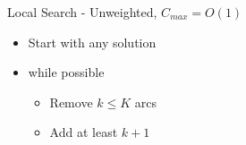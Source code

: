 \begin{frame}{Local Search - Unweighted, $C_{max} = O(1)$}
\begin{itemize}
  \item Start with any solution
  \item while possible
  	\begin{itemize}
  	  \item Remove $k \leq K$ arcs
  	  \item Add at least $k+1$
	\end{itemize}
\end{itemize}
\end{frame}